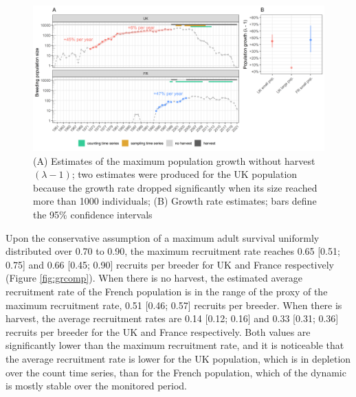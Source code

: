 \documentclass[
  english,
]{article}
\begin{document}
\begin{figure}[H]

{\centering \includegraphics[width=1\linewidth]{../Output/plot_6} 

}

\caption{(A) Estimates of the maximum population growth without harvest \((\lambda - 1)\); two estimates were produced for the UK population because the growth rate dropped significantly when its size reached more than 1000 individuals; (B) Growth rate estimates; bars define the 95\% confidence intervals}\label{fig:mgr}
\end{figure}

Upon the conservative assumption of a maximum adult survival uniformly distributed over 0.70 to 0.90, the maximum recruitment rate reaches 0.65 {[}0.51; 0.75{]} and 0.66 {[}0.45; 0.90{]} recruits per breeder for UK and France respectively (Figure \ref{fig:grcomp}). When there is no harvest, the estimated average recruitment rate of the French population is in the range of the proxy of the maximum recruitment rate, 0.51 {[}0.46; 0.57{]} recruits per breeder. When there is harvest, the average recruitment rates are 0.14 {[}0.12; 0.16{]} and 0.33 {[}0.31; 0.36{]} recruits per breeder for the UK and France respectively. Both values are significantly lower than the maximum recruitment rate, and it is noticeable that the average recruitment rate is lower for the UK population, which is in depletion over the count time series, than for the French population, which of the dynamic is mostly stable over the monitored period.
\end{document}
